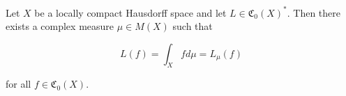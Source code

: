 Let $X$ be a locally compact Hausdorff space and let $L \in \mathfrak{C}_0(X)^*$. Then there exists a complex measure $\mu \in M(X)$ such that

$$L(f) = \int_X f d\mu = L_\mu(f)$$

for all $f \in \mathfrak{C}_0(X)$.
